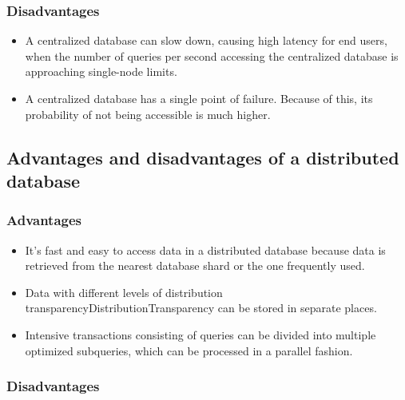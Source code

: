 \subsubsection{Disadvantages}\label{QIz1EDJUUaduBB3OwvCQO}

\begin{itemize}
\item
\protect{}\label{daJs-Gi98PioErF3SC6D6}
A centralized database can slow down, causing high latency for end users, when the number of queries per second accessing the centralized database is approaching single-node limits.
\item
\protect{}\label{r26_IJGxr7pT-inGrY3u1}
A centralized database has a single point of failure. Because of this, its probability of not being accessible is much higher.
\end{itemize}

\subsection{Advantages and disadvantages of a distributed database}\label{cLS69ijfM-ME26FoRzpVI}

\subsubsection{Advantages}\label{UPaZ9UQWrDd90WmlHV3jD}

\begin{itemize}
\item
\protect{}\label{wqaBuD18kQuWx4pvShYTB}
It's fast and easy to access data in a distributed database because data is retrieved from the nearest database shard or the one frequently used.
\item
\protect{}\label{70f98z_F6m9lWDXbBjFGa}
Data with different levels of distribution transparencyDistributionTransparency can be stored in separate places.
\item
\protect{}\label{wbGLzdC-xGA-6-i0TSEWU}
Intensive transactions consisting of queries can be divided into multiple optimized subqueries, which can be processed in a parallel fashion.
\end{itemize}

\subsubsection{Disadvantages}\label{N14Kxfstw-hd1CAU-NCT4}

